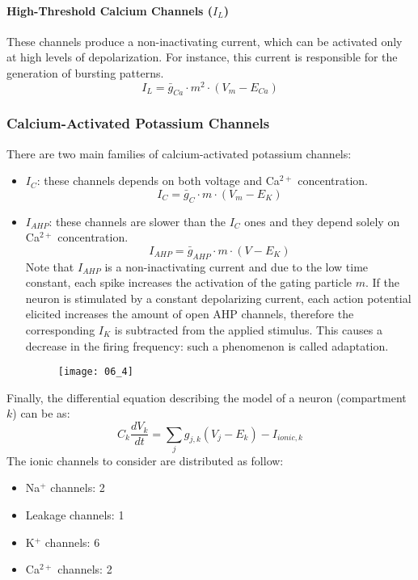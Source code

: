\paragraph{High-Threshold Calcium Channels (\(I_{L}\))} These channels produce a
non-inactivating current, which can be activated only at high levels of depolarization.
For instance, this current is responsible for the generation of bursting patterns.
\begin{equation*}
    I_{L}=\bar{g}_{Ca}\cdot{m^{2}}\cdot{(V_{m}-E_{Ca})}
\end{equation*}
\subsubsection{Calcium-Activated Potassium Channels}
There are two main families of calcium-activated potassium channels:
\begin{itemize}
    \item \textbf{\(I_{C}\)}: these channels depends on both voltage and Ca\({}^{2+}\)
          concentration.
          \begin{equation*}
              I_{C}=\bar{g}_{C}\cdot{m}\cdot{(V_{m}-E_{K})}
          \end{equation*}
    \item \textbf{\(I_{AHP}\)}: these channels are slower than the \(I_{C}\) ones and they
          depend solely on Ca\({}^{2+}\) concentration.
          \begin{equation*}
              I_{AHP}=\bar{g}_{AHP}\cdot{m}\cdot{(V-E_{K})}
          \end{equation*}
          Note that \(I_{AHP}\) is a non-inactivating current and due to the low time constant,
          each spike increases the activation of the gating particle \(m\). If the neuron is
          stimulated by a constant depolarizing current, each action potential elicited increases
          the amount of open AHP channels, therefore the corresponding  \(I_{K}\) is
          subtracted from the applied stimulus. This causes a decrease in the firing frequency:
          such a phenomenon is called adaptation.
          \begin{figure}[H]
              \texttt{[image: 06\_4]}
              \centering
          \end{figure}
\end{itemize}
Finally, the differential equation describing the model of a neuron (compartment \(k\))
can be as:
\begin{equation*}
    C_{k}\frac{dV_{k}}{dt}=\sum_{j}g_{j,k}(V_{j}-E_{k})-I_{ionic,k}
\end{equation*}
The ionic channels to consider are distributed as follow:
\begin{itemize}
    \item Na\({}^{+}\) channels: 2
    \item Leakage channels: 1
    \item K\({}^{+}\) channels: 6
    \item Ca\({}^{2+}\) channels: 2
\end{itemize}

